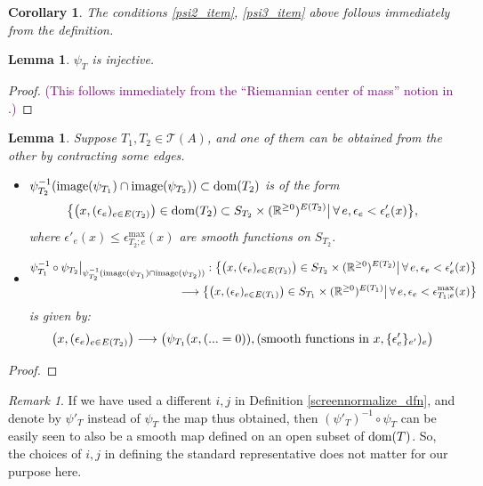 \documentclass[11pt]{article}
\newtheorem{lmm}[thm]{Lemma}
\newtheorem{crl}[thm]{Corollary}
\theoremstyle{definition}
\theoremstyle{remark}
\newtheorem{rmk}[thm]{Remark}
\def\R{\mathbb{R}}
\def\cT{\mathcal{T}}
\def\dom{{\tn{dom}}}
\def\cmt#1{\textcolor{purple}{(#1)}}
\def\tn#1{\textnormal{#1}}
\begin{document}
\begin{crl}
The conditions \ref{psi2_item}, \ref{psi3_item} above follows immediately from the definition. 
\end{crl}

\begin{lmm}
$\psi_T$ is injective. 
\end{lmm}
\begin{proof}
\cmt{This follows immediately from the ``Riemannian center of mass'' notion in \cite{GroveKarcher}.}
\end{proof}

\begin{lmm}
Suppose $T_1,T_2\in\cT(A)$, and one of them can be obtained from the other by contracting some edges.  
\begin{itemize}
\item $\psi_{T_2}^{-1}(\tn{image}(\psi_{T_1})\cap\tn{image}(\psi_{T_2}))\subset\dom(T_2)$ is of the form 
$$\big\{\big(x,(\epsilon_e)_{e\in E(T_2)}\big)\in \dom(T_2)\subset S_{T_2}\times(\R^{\ge0})^{E(T_2)}\big|\,\forall\,e, \epsilon_e<\epsilon'_e(x)\big\},$$
where $\epsilon'_e(x)\le \epsilon^{\max}_{T_2;e}(x)$ are smooth functions on $S_{T_2}$. 
\item 
\begin{align*}
\psi_{T_1}^{-1}\circ\psi_{T_2}\big|_{\psi_{T_2}^{-1}(\tn{image}(\psi_{T_1})\cap\tn{image}(\psi_{T_2}))}:
\big\{\big(x,(\epsilon_e)_{e\in E(T_2)}\big)\in S_{T_2}\times(\R^{\ge0})^{E(T_2)}\big|\,\forall\,e, \epsilon_e<\epsilon'_e(x)\big\}\\
\longrightarrow
\big\{\big(x,(\epsilon_e)_{e\in E(T_1)}\big)\in S_{T_1}\times(\R^{\ge0})^{E(T_1)}\big|\,\forall\,e, \epsilon_e<\epsilon^{\max}_{T_1;e}(x)\big\}
\end{align*}
is given by: 
$$
\big(x,(\epsilon_e)_{e\in E(T_2)}\big)\longrightarrow \big( \psi_{T_1}(x,(...=0)), (\tn{smooth functions in }x, \{\epsilon_e'\}_{e'})_e \big)
$$
\end{itemize}
\end{lmm}

\begin{proof}

\end{proof}

\begin{rmk}
If we have used a different $i,j$ in Definition \ref{screennormalize_dfn}, and denote by $\psi'_T$ instead of $\psi_T$ the map thus obtained, then $(\psi'_T)^{-1}\circ\psi_T$ can be easily seen to also be a smooth map defined on an open subset of $\dom(T)$. So, the choices of $i,j$ in defining the standard representative does not matter for our purpose here. 
\end{rmk}
\end{document}
